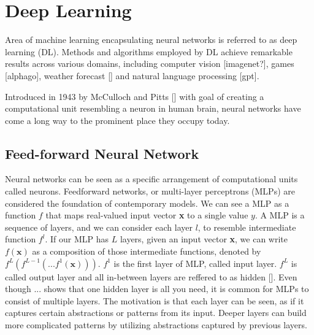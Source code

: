 
\section{Deep Learning}

Area of machine learning encapsulating neural networks is referred to as deep learning (DL). Methods and algorithms employed by DL achieve remarkable results across various domains, including computer vision [imagenet?], games [alphago], weather forecast [] and natural language processing [gpt].

Introduced in 1943 by McCulloch and Pitts [] with goal of creating a computational unit resembling a neuron in human brain, neural networks have come a long way to the prominent place they occupy today.


\subsection*{Feed-forward Neural Network}

Neural networks can be seen as a specific arrangement of computational units called neurons. Feedforward networks, or multi-layer perceptrons (MLPs) are considered the foundation of contemporary models. We can see a MLP as a function $f$ that maps real-valued input vector \textbf{x} to a single value $y$. A MLP is a sequence of layers, and we can consider each layer $l$, to resemble intermediate function $f^l$. If our MLP has $L$ layers, given an input vector \textbf{x}, we can write $f(\textbf{x})$ as a composition of those intermediate functions, denoted by $f^L(f^{L-1}(...f^1(\textbf{x})))$. $f^1$ is the first layer of MLP, called input layer. $f^L$ is called output layer and all in-between layers are reffered to as hidden []. Even though ... shows that one hidden layer is all you need, it is common for MLPs to consist of multiple layers. The motivation is that each layer can be seen, as if it captures certain abstractions or patterns from its input. Deeper layers can build more complicated patterns by utilizing abstractions captured by previous layers. %

